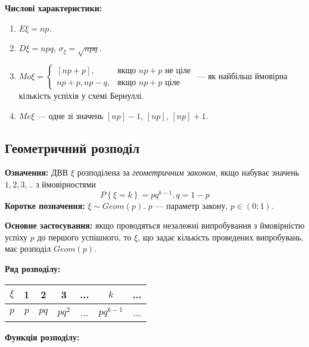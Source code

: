 \noindent\textbf{Числові характеристики:}
\begin{enumerate}
    \item $E\xi = np$.
    \item $D\xi = npq$, $\sigma_\xi = \sqrt{npq}$.
    \item ${Mo}\xi = \begin{cases}
        \left[np+p\right], & \text{якщо } np+p \text{ не ціле}\\
        np+p, np-q, & \text{якщо } np+p \text{ ціле}
    \end{cases}$ --- як найбільш ймовірна кількість успіхів у схемі Бернуллі.
    \item ${Me}\xi$ --- одне зі значень $\left[np\right] - 1$, $\left[np\right]$, $\left[np\right] + 1$.
\end{enumerate}

\subsection{Геометричний розподіл}
\noindent\textbf{Означення:}
    ДВВ $\xi$ розподілена за \emph{геометричним законом}, 
    якщо набуває значень $1,2,3,..$ з ймовірностями \begin{equation}
        P\left\{\xi = k\right\} = pq^{k-1}, q = 1 - p
    \end{equation}
    \textbf{Коротке позначення:} $\xi \sim {Geom}(p)$.
    $p$ --- параметр закону, $p\in (0;1)$.

\noindent\textbf{Основне застосування:} якщо проводяться незалежні випробування з ймовірністю успіху $p$ до першого успішного,
то $\xi$, що задає кількість проведених випробувань, має розподіл ${Geom}(p)$.

\noindent\textbf{Ряд розподілу:}

\begin{tabular}{c|c|c|c|c|c|c}
    $\xi$ & 1 & 2 & 3 & ... & $k$ & ... \\
    \hline
    $p$ & $p$ & $pq$ & $pq^2$ & ... & $pq^{k-1}$ & ...
\end{tabular}

\noindent\textbf{Функція розподілу:}

